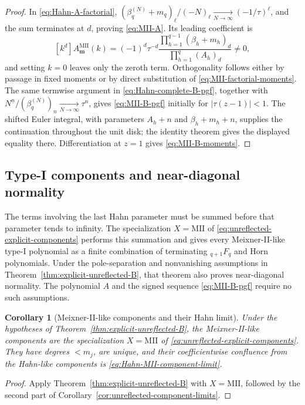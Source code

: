 \documentclass[10pt]{amsart}
\newcommand{\mm}{\boldsymbol m}
\newcommand{\abs}[1]{\lvert#1\rvert}
\newcommand{\fall}[2]{#1^{\underline{#2}}}
\theoremstyle{plain}
\newtheorem{corollary}[theorem]{Corollary}
\theoremstyle{definition}
\theoremstyle{remark}
\begin{document}
\begin{proof}
In \eqref{eq:Hahn-A-factorial},
\((\beta_q^{(N)}+m_q)_\ell/(-N)_\ell
\xrightarrow[N\to\infty]{}(-1/\tau)^\ell\),
and the sum terminates at \(d\), proving \eqref{eq:MII-A}. Its leading
coefficient is
\[
 [k^d]A_{\mm}^{\mathrm{MII}}(k)
 =(-1)^d\tau^{-d}
  \frac{\prod_{h=1}^{q-1}(\beta_h+m_h)_d}
       {\prod_{h=1}^{q}(A_h)_d}\ne0,
\]
and setting \(k=0\) leaves only the zeroth term. Orthogonality
follows either by passage in fixed moments or by direct substitution of
\eqref{eq:MII-factorial-moments}. The same termwise argument in
\eqref{eq:Hahn-complete-B-pgf}, together with
\(\fall{N}{n}/(\beta_q^{(N)})_n
\xrightarrow[N\to\infty]{}\tau^n\), gives
\eqref{eq:MII-B-pgf} initially for \(\abs{\tau(z-1)}<1\). The
shifted Euler integral, with parameters \(A_h+n\) and
\(\beta_h+m_h+n\), supplies the continuation throughout the unit disk; the
identity theorem gives the displayed equality there. Differentiation at
\(z=1\) gives
\eqref{eq:MII-B-moments}.
\end{proof}

\subsection{Type-I components and near-diagonal normality}

The terms involving the last Hahn parameter must be summed before that
parameter tends to infinity.  The specialization \(X=\mathrm{MII}\) of
\eqref{eq:unreflected-explicit-components} performs this summation and
gives every Meixner-II-like type-I polynomial as a finite combination of
terminating \({}_{q+1}F_q\) and Horn polynomials.  Under the pole-separation
and nonvanishing assumptions in Theorem~\ref{thm:explicit-unreflected-B},
that theorem also proves near-diagonal normality.  The polynomial \(A\) and
the signed sequence \eqref{eq:MII-B-pgf} require no such assumptions.

\begin{corollary}[Meixner-II-like components and their Hahn limit]
Under the hypotheses of Theorem~\ref{thm:explicit-unreflected-B}, the
Meixner-II-like components are the specialization $X=\mathrm{MII}$ of
\eqref{eq:unreflected-explicit-components}. They have degrees $<m_j$,
are unique, and their coefficientwise confluence from the Hahn-like
components is \eqref{eq:Hahn-MII-component-limit}.
\end{corollary}

\begin{proof}
Apply Theorem~\ref{thm:explicit-unreflected-B} with
$X=\mathrm{MII}$, followed by the second part of
Corollary~\ref{cor:unreflected-component-limits}.
\end{proof}
\end{document}
